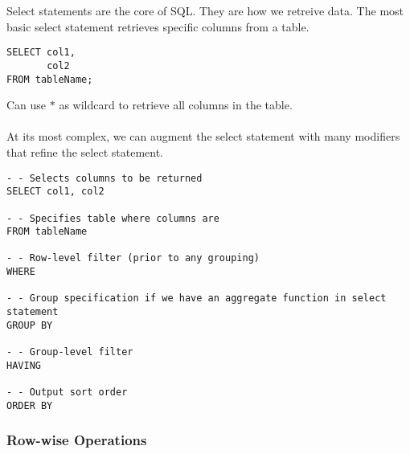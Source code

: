 \documentclass[12pt]{article}
\theoremstyle{plain}
\theoremstyle{definition}
\theoremstyle{remark}
\begin{document}
Select statements are the core of SQL.
They are how we retreive data.
The most basic select statement retrieves specific columns from a table.
\begin{lstlisting}
SELECT col1,
       col2
FROM tableName;
\end{lstlisting}
Can use $*$ as wildcard to retrieve all columns in the table.
\\
\\
At its most complex, we can augment the select statement with many
modifiers that refine the select statement.
\begin{lstlisting}
- - Selects columns to be returned
SELECT col1, col2

- - Specifies table where columns are
FROM tableName

- - Row-level filter (prior to any grouping)
WHERE

- - Group specification if we have an aggregate function in select statement
GROUP BY

- - Group-level filter
HAVING

- - Output sort order
ORDER BY
\end{lstlisting}



\clearpage
\subsubsection{Row-wise Operations}
\end{document}
